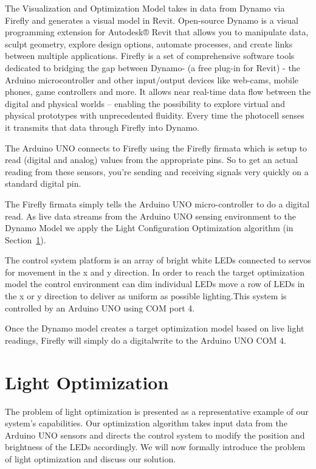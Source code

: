 \documentclass[a4paper]{article}
\begin{document}
The Visualization and Optimization Model takes in data from Dynamo via Firefly and generates a visual model in Revit.
Open-source Dynamo is a visual programming extension for Autodesk® Revit that allows you to manipulate data, sculpt geometry, explore design options, automate processes, and create links between multiple applications. 
Firefly is a set of comprehensive software tools dedicated to bridging the gap between Dynamo- (a free plug-in for Revit) - the Arduino microcontroller and other input/output devices like web-cams, mobile phones, game controllers and more. It allows near real-time data flow between the digital and physical worlds – enabling the possibility to explore virtual and physical prototypes with unprecedented fluidity.
Every time the photocell senses it transmits that data through Firefly into Dynamo.

The Arduino UNO connects to Firefly using the Firefly firmata which is setup to read (digital and analog) values from the appropriate pins. So to get an actual reading from these sensors, you're sending and receiving signals very quickly on a standard digital pin. 

The Firefly firmata simply tells the Arduino UNO micro-controller to do a digital read. As  live data streams from the Arduino UNO sensing environment to the Dynamo Model we apply the Light Configuration Optimization algorithm (in Section~\ref{sec:optimization}).

The control system platform is an array of bright white LEDs connected to servos for movement in the x and y direction. In order to reach the target optimization model the control environment can dim individual LEDs move a row of LEDs in the x or y direction to deliver as uniform as possible lighting.This system is controlled by an Arduino UNO using COM port 4. 

Once the Dynamo model creates a target optimization model based on live light readings, Firefly will simply do a digitalwrite to the Arduino UNO COM 4. 



\section{Light Optimization}
\label{sec:optimization}
The problem of light optimization is presented as a representative example of our system's capabilities. Our optimization algorithm takes input data from the Arduino UNO sensors and directs the control system to modify the position and brightness of the LEDs accordingly. We will now formally introduce the problem of light optimization and discuss our solution.
\end{document}
